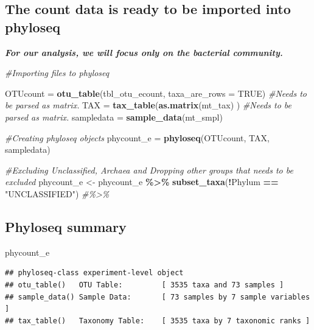 \documentclass[
]{article}
\newenvironment{Shaded}{\begin{snugshade}}{\end{snugshade}}
\newcommand{\AttributeTok}[1]{\textcolor[rgb]{0.13,0.29,0.53}{#1}}
\newcommand{\CommentTok}[1]{\textcolor[rgb]{0.56,0.35,0.01}{\textit{#1}}}
\newcommand{\ConstantTok}[1]{\textcolor[rgb]{0.56,0.35,0.01}{#1}}
\newcommand{\FunctionTok}[1]{\textcolor[rgb]{0.13,0.29,0.53}{\textbf{#1}}}
\newcommand{\NormalTok}[1]{#1}
\newcommand{\OtherTok}[1]{\textcolor[rgb]{0.56,0.35,0.01}{#1}}
\newcommand{\SpecialCharTok}[1]{\textcolor[rgb]{0.81,0.36,0.00}{\textbf{#1}}}
\newcommand{\StringTok}[1]{\textcolor[rgb]{0.31,0.60,0.02}{#1}}
\begin{document}
\subsection{The count data is ready to be imported into
phyloseq}\label{the-count-data-is-ready-to-be-imported-into-phyloseq}

\textbf{\emph{For our analysis, we will focus only on the bacterial
community.}}

\begin{Shaded}
\begin{Highlighting}[]
\CommentTok{\#Importing files to phyloseq}

\NormalTok{OTUcount }\OtherTok{=} \FunctionTok{otu\_table}\NormalTok{(tbl\_otu\_ecount, }
                \AttributeTok{taxa\_are\_rows =} \ConstantTok{TRUE}\NormalTok{)}
      \CommentTok{\#Needs to be parsed as matrix.}
\NormalTok{TAX }\OtherTok{=} \FunctionTok{tax\_table}\NormalTok{(}\FunctionTok{as.matrix}\NormalTok{(mt\_tax)}
\NormalTok{                )}
      \CommentTok{\#Needs to be parsed as matrix.}
\NormalTok{sampledata }\OtherTok{=} \FunctionTok{sample\_data}\NormalTok{(mt\_smpl)}

\CommentTok{\#Creating phyloseq objects}
\NormalTok{phycount\_e }\OtherTok{=} \FunctionTok{phyloseq}\NormalTok{(OTUcount, TAX, sampledata)}

\CommentTok{\#Excluding Unclassified, Archaea and Dropping other groups that needs to be excluded}
\NormalTok{phycount\_e }\OtherTok{\textless{}{-}}\NormalTok{ phycount\_e }\SpecialCharTok{\%\textgreater{}\%}
  \FunctionTok{subset\_taxa}\NormalTok{(}\SpecialCharTok{!}\NormalTok{Phylum }\SpecialCharTok{==} \StringTok{"UNCLASSIFIED"}\NormalTok{) }\CommentTok{\#\%\textgreater{}\%}
\end{Highlighting}
\end{Shaded}

\subsection{Phyloseq summary}\label{phyloseq-summary}

\begin{Shaded}
\begin{Highlighting}[]
\NormalTok{phycount\_e}
\end{Highlighting}
\end{Shaded}

\begin{verbatim}
## phyloseq-class experiment-level object
## otu_table()   OTU Table:         [ 3535 taxa and 73 samples ]
## sample_data() Sample Data:       [ 73 samples by 7 sample variables ]
## tax_table()   Taxonomy Table:    [ 3535 taxa by 7 taxonomic ranks ]
\end{verbatim}
\end{document}
